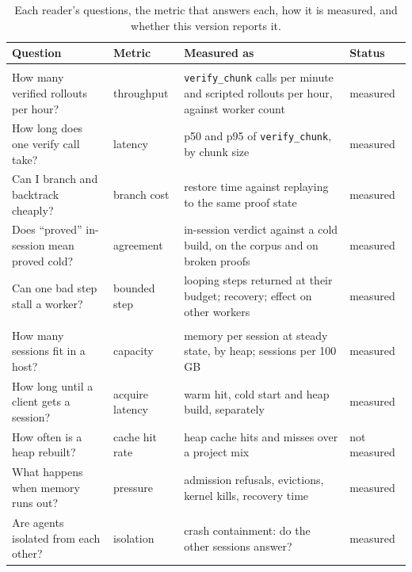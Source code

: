 \documentclass[11pt]{article}
\newcommand{\code}[1]{\colorbox{gray!12}{\texttt{\vphantom{Ag}#1}}}
\begin{document}
\begin{table}[t]
\centering\small
\begin{tabularx}{\textwidth}{@{}>{\raggedright\arraybackslash}X l >{\raggedright\arraybackslash}X l@{}}
\toprule
Question & Metric & Measured as & Status \\
\midrule
\multicolumn{4}{@{}l}{\emph{Training reader} (Section~\ref{sec:training})} \\
How many verified rollouts per hour? & throughput & \code{verify\_chunk} calls per minute and scripted rollouts per hour, against worker count & measured \\
How long does one verify call take? & latency & p50 and p95 of \code{verify\_chunk}, by chunk size & measured \\
Can I branch and backtrack cheaply? & branch cost & restore time against replaying to the same proof state & measured \\
Does ``proved'' in-session mean proved cold? & agreement & in-session verdict against a cold build, on the corpus and on broken proofs & measured \\
Can one bad step stall a worker? & bounded step & looping steps returned at their budget; recovery; effect on other workers & measured \\
\midrule
\multicolumn{4}{@{}l}{\emph{Operator} (Section~\ref{sec:serving})} \\
How many sessions fit in a host? & capacity & memory per session at steady state, by heap; sessions per 100\,GB & measured \\
How long until a client gets a session? & acquire latency & warm hit, cold start and heap build, separately & measured \\
How often is a heap rebuilt? & cache hit rate & heap cache hits and misses over a project mix & not measured \\
What happens when memory runs out? & pressure & admission refusals, evictions, kernel kills, recovery time & measured \\
Are agents isolated from each other? & isolation & crash containment: do the other sessions answer? & measured \\
\bottomrule
\end{tabularx}
\caption{Each reader's questions, the metric that answers each, how it is measured, and whether this version reports it.}
\label{tab:metrics}
\end{table}

\end{document}
